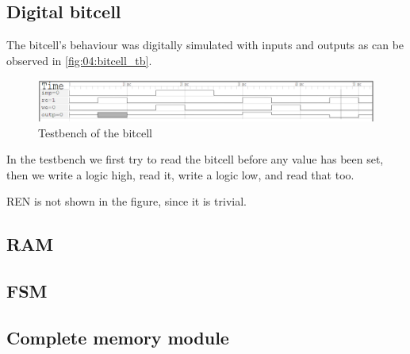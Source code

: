 \subsection{Digital bitcell}
The bitcell's behaviour was digitally simulated with inputs and outputs as can be observed in \autoref{fig:04:bitcell_tb}.

\begin{figure}
    \centering
    \includegraphics[width=0.9\linewidth]{LaTeX_2/Figures/bitcell_tb.png}
    \caption{Testbench of the bitcell}
    \label{fig:04:bitcell_tb}
\end{figure}

In the testbench we first try to read the bitcell before any value has been set, then we write a logic high, read it, write a logic low, and read that too. 

REN is not shown in the figure, since it is trivial.

\subsection{RAM}



\subsection{FSM}



\subsection{Complete memory module}


